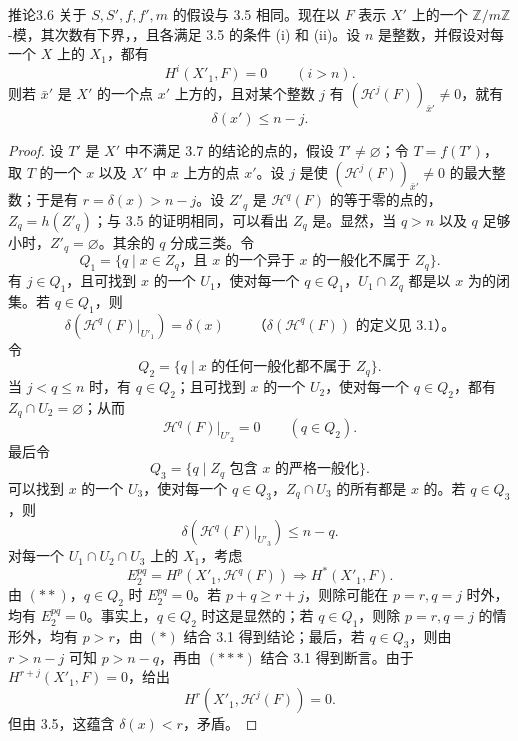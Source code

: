 \begin{SGAresult}{推论}{3.6}
关于 $S,S',f,f',m$ 的假设与 3.5 相同。现在以 $F$ 表示 $X'$ 上的一个 $\mathbb Z/m\mathbb Z$-模，其次数有下界，，且各满足 3.5 的条件 (i) 和 (ii)。设 $n$ 是整数，并假设对每一个 $X$ 上的 $X_1$，都有
\[
H^i(X'_1,F)=0\qquad(i>n).
\]
则若 $\bar x'$ 是 $X'$ 的一个点 $x'$ 上方的，且对某个整数 $j$ 有 $(\mathcal H^j(F))_{\bar x'}\ne0$，就有
\[
\delta(x')\leq n-j.
\]
\end{SGAresult}
\begin{proof}
设 $T'$ 是 $X'$ 中不满足 3.7 的结论的点的，假设 $T'\ne\varnothing$；令 $T=f(T')$，取 $T$ 的一个 $x$ 以及 $X'$ 中 $x$ 上方的点 $x'$。设 $j$ 是使 $(\mathcal H^j(F))_{\bar x'}\ne0$ 的最大整数；于是有 $r=\delta(x)>n-j$。设 $Z'_q$ 是 $\mathcal H^q(F)$ 的等于零的点的，$Z_q=h(Z'_q)$；与 3.5 的证明相同，可以看出 $Z_q$ 是。显然，当 $q>n$ 以及 $q$ 足够小时，$Z'_q=\varnothing$。其余的 $q$ 分成三类。令
\[
Q_1=\{q\mid x\in Z_q\text{，且 }x\text{ 的一个异于 }x\text{ 的一般化不属于 }Z_q\}.
\]
有 $j\in Q_1$，且可找到 $x$ 的一个 $U_1$，使对每一个 $q\in Q_1$，$U_1\cap Z_q$ 都是以 $x$ 为的闭集。若 $q\in Q_1$，则
\[
\delta(\mathcal H^q(F)|_{U'_1})=\delta(x)
\qquad\text{（$\delta(\mathcal H^q(F))$ 的定义见 3.1）。}\tag{*}
\]
令
\[
Q_2=\{q\mid x\text{ 的任何一般化都不属于 }Z_q\}.
\]
当 $j<q\leq n$ 时，有 $q\in Q_2$；且可找到 $x$ 的一个 $U_2$，使对每一个 $q\in Q_2$，都有 $Z_q\cap U_2=\varnothing$；从而
\[
\mathcal H^q(F)|_{U'_2}=0\qquad(q\in Q_2).\tag{**}
\]
最后令
\[
Q_3=\{q\mid Z_q\text{ 包含 }x\text{ 的严格一般化}\}.
\]
可以找到 $x$ 的一个 $U_3$，使对每一个 $q\in Q_3$，$Z_q\cap U_3$ 的所有都是 $x$ 的。若 $q\in Q_3$，则
\[
\delta(\mathcal H^q(F)|_{U'_3})\leq n-q.\tag{***}
\]
对每一个 $U_1\cap U_2\cap U_3$ 上的 $X_1$，考虑
\[
E_2^{pq}=H^p(X'_1,\mathcal H^q(F))\Longrightarrow H^*(X'_1,F).
\]
由 $(**)$，$q\in Q_2$ 时 $E_2^{pq}=0$。若 $p+q\geq r+j$，则除可能在 $p=r,q=j$ 时外，均有 $E_2^{pq}=0$。事实上，$q\in Q_2$ 时这是显然的；若 $q\in Q_1$，则除 $p=r,q=j$ 的情形外，均有 $p>r$，由 $(*)$ 结合 3.1 得到结论；最后，若 $q\in Q_3$，则由 $r>n-j$ 可知 $p>n-q$，再由 $(***)$ 结合 3.1 得到断言。由于 $H^{r+j}(X'_1,F)=0$，给出
\[
H^r(X'_1,\mathcal H^j(F))=0.
\]
但由 3.5，这蕴含 $\delta(x)<r$，矛盾。
\end{proof}

